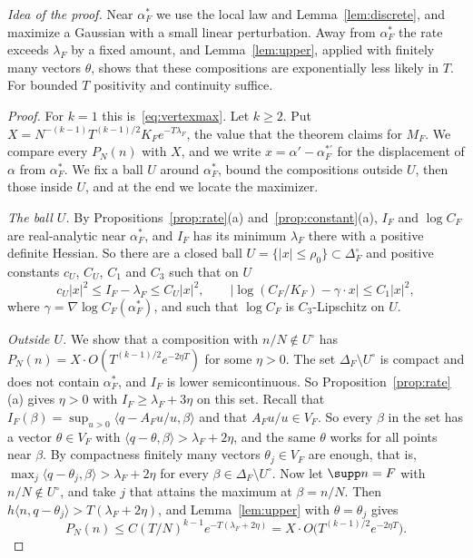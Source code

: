 \emph{Idea of the proof.} Near $\alpha^*_F$ we use the local law and
Lemma~\ref{lem:discrete}, and maximize a Gaussian with a small linear
perturbation. Away from $\alpha^*_F$ the rate exceeds $\lambda_F$ by a fixed
amount, and Lemma~\ref{lem:upper}, applied with finitely many vectors $\theta$,
shows that these compositions are exponentially less likely in $T$. For bounded
$T$ positivity and continuity suffice.

\begin{proof}
For $k=1$ this is~\eqref{eq:vertexmax}. Let $k\ge2$. Put
$X=N^{-(k-1)}T^{(k-1)/2}K_Fe^{-T\lambda_F}$, the value that the theorem claims for $M_F$. We
compare every $P_N(n)$ with $X$, and we write $x=\alpha'-\alpha^{*\prime}_F$ for the
displacement of $\alpha$ from $\alpha^*_F$. We fix a ball $U$ around $\alpha^*_F$, bound the
compositions outside $U$, then those inside $U$, and at the end we locate the maximizer.

\emph{The ball $U$.} By Propositions~\ref{prop:rate}(a) and~\ref{prop:constant}(a), $I_F$ and
$\log C_F$ are real-analytic near $\alpha^*_F$, and $I_F$ has its minimum $\lambda_F$ there with
a positive definite Hessian. So there are a closed ball
$U=\{|x|\le\rho_0\}\subset\Delta_F^\circ$ and positive constants $c_U$, $C_U$, $C_1$ and $C_3$
such that on $U$
\[
c_U|x|^2\le I_F-\lambda_F\le C_U|x|^2,\qquad
\bigl|\log(C_F/K_F)-\gamma\cdot x\bigr|\le C_1|x|^2,
\]
where $\gamma=\nabla\log C_F(\alpha^*_F)$, and such that $\log C_F$ is $C_3$-Lipschitz on $U$.

\emph{Outside $U$.} We show that a composition with $n/N\notin U^\circ$ has
$P_N(n)=X\cdot O(T^{(k-1)/2}e^{-2\eta T})$ for some $\eta>0$. The set $\Delta_F\setminus U^\circ$
is compact and does not contain $\alpha^*_F$, and $I_F$ is lower semicontinuous. So
Proposition~\ref{prop:rate}(a) gives $\eta>0$ with $I_F\ge\lambda_F+3\eta$ on this set. Recall
that $I_F(\beta)=\sup_{u>0}\langle q-A_Fu/u,\beta\rangle$ and that $A_Fu/u\in V_F$. So every
$\beta$ in the set has a vector $\theta\in V_F$ with
$\langle q-\theta,\beta\rangle>\lambda_F+2\eta$, and the same $\theta$ works for all points near
$\beta$. By compactness finitely many vectors $\theta_j\in V_F$ are enough, that is,
$\max_j\langle q-\theta_j,\beta\rangle>\lambda_F+2\eta$ for every
$\beta\in\Delta_F\setminus U^\circ$. Now let $\supp n=F$ with $n/N\notin U^\circ$, and take $j$
that attains the maximum at $\beta=n/N$. Then $h\langle n,q-\theta_j\rangle>T(\lambda_F+2\eta)$,
and Lemma~\ref{lem:upper} with $\theta=\theta_j$ gives
\[
P_N(n)\le C(T/N)^{k-1}e^{-T(\lambda_F+2\eta)}=X\cdot O\bigl(T^{(k-1)/2}e^{-2\eta T}\bigr).
\]


\end{proof}
